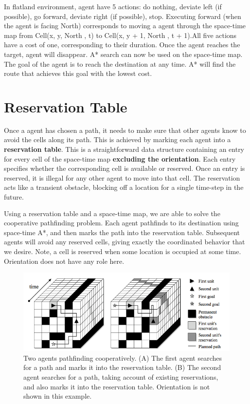 \vspace{\baselineskip}

In flatland environment, agent have 5 actions: do nothing, deviate left (if possible), go forward, deviate right (if possible), stop.
Executing forward (when the agent is facing North) corresponds to moving a agent through the space-time map from
Cell(x, y, North , t) to Cell(x, y + 1, North , t + 1).All five actions have a cost
of one, corresponding to their duration. Once the agent reaches the target, agent will 
disappear. A* search can now be used on the space-time map. The goal of the agent is to reach the
destination at any time. A* will find the route that achieves this goal with the lowest cost.

\section{Reservation Table}
Once a agent has chosen a path, it needs to make sure that other agents know to avoid the
cells along its path. This is achieved by marking each agent into a \textbf{reservation table}. This is
a straightforward data structure containing an entry for every cell of the space-time map \textbf{excluding the orientation}.
Each entry specifies whether the corresponding cell is available or reserved. Once an
entry is reserved, it is illegal for any other agent to move into that cell. The reservation acts
like a transient obstacle, blocking off a location for a single time-step in the future.

\vspace{\baselineskip}
Using a reservation table and a space-time map, we are able to solve the cooperative
pathfinding problem. Each agent pathfinds to its destination using space-time A*, and then
marks the path into the reservation table. Subsequent agents will avoid any
reserved cells, giving exactly the coordinated behavior that we desire.
Note, a cell is reserved when some location is occupied at some time. Orientation does not have 
any role here.

\begin{figure}[h]
    \centering
    \includegraphics[width=1.0\textwidth]{Cooperative1}
    \caption{ Two agents pathfinding cooperatively. (A) The first agent searches for a path and
    marks it into the reservation table. (B) The second agent searches for a path, taking account
    of existing reservations, and also marks it into the reservation table. Orientation is not shown in 
    this example.\cite{ARTICLE:8}}
    \label{image-myimage2}
\end{figure}

